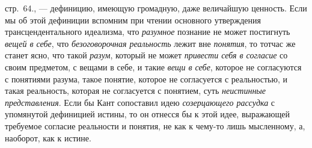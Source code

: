 \documentclass[twoside]{article}
\begin{document}
{{{стр.~64.}\label{bkm:bm09},
— дефиницию, имеющую громадную, даже величайшую ценность.
Если мы об этой дефиниции вспомним при чтении основного утверждения
трансцендентального идеализма, что
{\em разумное} познание
не может постигнуть {\em вещей в себе},
что {\em безоговорочная
реальность} лежит вне
{\em понятия}, то тотчас
же станет ясно, что такой {\em разум},
который не может
{\em привести себя в согласие}
со своим предметом, с вещами в себе, и такие
{\em вещи в себе},
которое не согласуются с понятиями разума, такое понятие,
которое не согласуется с реальностью, и такая реальность, которая не
согласуется с понятием, суть
{\em неистинные представления}.
Если бы Кант сопоставил идею
{\em созерцающего рассудка}
с упомянутой дефиницией истины, то он отнесся бы к этой идее,
выражающей требуемое согласие реальности и понятия, не как к чему-то лишь
мысленному, а, наоборот, как к истине.

}}
\end{document}
